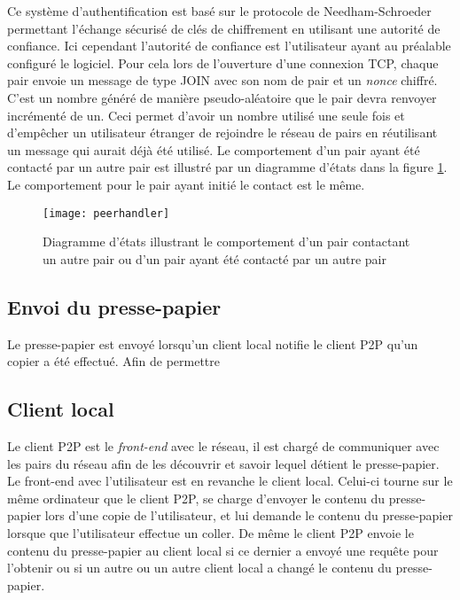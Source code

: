Ce système d'authentification est basé sur le protocole de Needham-Schroeder
\cite{1978Needham} permettant l'échange sécurisé de clés de chiffrement
en utilisant une autorité de confiance. Ici cependant l'autorité de confiance
est l'utilisateur ayant au préalable configuré le logiciel.
Pour cela lors de l'ouverture d'une connexion TCP, chaque
pair envoie un message de type JOIN avec son nom de pair et un
\emph{nonce} chiffré. C'est un nombre généré de manière pseudo-aléatoire que
le pair devra renvoyer incrémenté de un. Ceci permet d'avoir un nombre
utilisé une seule fois et d'empêcher un utilisateur étranger
de rejoindre le réseau de pairs en réutilisant un message qui aurait déjà
été utilisé. Le comportement d'un pair ayant été contacté par un autre pair
est illustré par un diagramme d'états dans la figure \ref{fig:peerhandler}.
Le comportement pour le pair ayant initié le contact est le même.

\begin{figure}[!h]
  \centering
  \texttt{[image: peerhandler]}
  \caption{Diagramme d'états illustrant le comportement d'un pair
    contactant un autre pair ou d'un pair ayant été contacté par un autre
    pair}
  \label{fig:peerhandler}
\end{figure}

\subsection{Envoi du presse-papier}
Le presse-papier est envoyé lorsqu'un client local notifie le client
P2P qu'un copier a été effectué. Afin de permettre 

\subsection{Client local}
Le client P2P est le \emph{front-end} avec le réseau, il est chargé
de communiquer avec les pairs du réseau afin de les découvrir et savoir
lequel détient le presse-papier. Le front-end avec l'utilisateur
est en revanche le client local. Celui-ci tourne sur le même ordinateur
que le client P2P, se charge d'envoyer le contenu du presse-papier
lors d'une copie de l'utilisateur, et lui demande le contenu du presse-papier
lorsque que l'utilisateur effectue un coller.
De même le client P2P envoie le contenu du presse-papier au client local si
ce dernier a envoyé une requête pour l'obtenir ou si un autre ou un autre
client local a changé le contenu du presse-papier.

